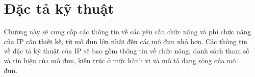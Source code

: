 \clearpage
{}

\setcounter{chapter}{1}
\chapter[{ĐẶC TẢ KỸ THUẬT}]{Đặc tả kỹ thuật}

Chương này sẽ cung cấp các thông tin về các yêu cầu chức năng và phi chức năng của IP cần thiết kế, từ mô đun lớn nhất đến các mô đun nhỏ hơn. Các thông tin về đặc tả kỹ thuật của IP sẽ bao gồm thông tin về chức năng, danh sách tham số và tín hiệu của mô đun, kiến trúc ở mức hành vi và mô tả dạng sóng của mô đun.

